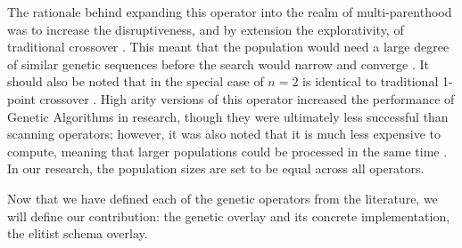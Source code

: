 The rationale behind expanding this operator into the realm of multi-parenthood was to increase the disruptiveness, and by extension the explorativity, of traditional crossover \cite{Eiben97}. This meant that the population would need a large degree of similar genetic sequences before the search would narrow and converge \cite{Eiben95}. It should also be noted that in the special case of $n = 2$ is identical to traditional 1-point crossover \cite{Eiben95}. High arity versions of this operator increased the performance of Genetic Algorithms in research, though they were ultimately less successful than scanning operators; however, it was also noted that it is much less expensive to compute, meaning that larger populations could be processed in the same time \cite{Eiben95}. In our research, the population sizes are set to be equal across all operators.

Now that we have defined each of the genetic operators from the literature, we will define our contribution: the genetic overlay and its concrete implementation, the elitist schema overlay.